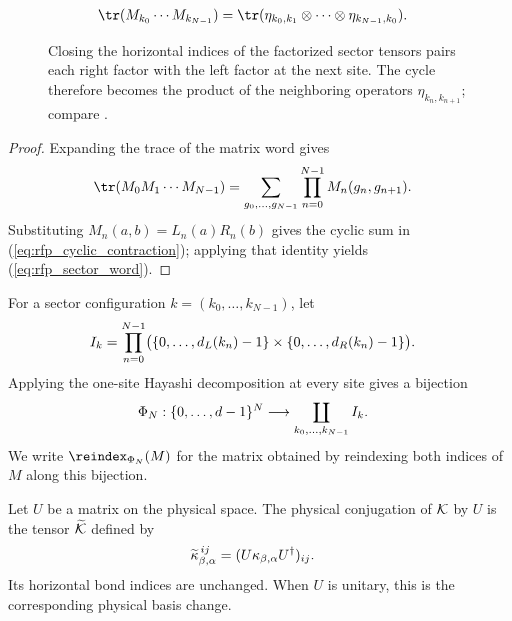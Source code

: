 \begin{figure}[ht]
    \centering
    \begin{align}
        \tr(M_{k_0}\cdots M_{k_{N-1}})
         & =\tr(\eta_{k_0,k_1}\otimes\cdots\otimes\eta_{k_{N-1},k_0}).
        \notag
    \end{align}
    \caption{Closing the horizontal indices of the factorized sector tensors
        pairs each right factor with the left factor at the next site. The cycle
        therefore becomes the product of the neighboring operators
        $\eta_{k_n,k_{n+1}}$; compare
        \cite[Appendix~C.2, lines~1446--1450]{Cirac2016MPDO_arXiv}.}
    \label{fig:mpdo_cyclic_eta_contraction}
\end{figure}

\begin{proof}
    \leanok
    Expanding the trace of the matrix word gives
    \begin{align}
        \tr(M_0M_1\cdots M_{N-1})
         & =\sum_{g_0,\ldots,g_{N-1}}
        \prod_{n=0}^{N-1}M_n(g_n,g_{n+1}). \notag
    \end{align}
    Substituting $M_n(a,b)=L_n(a)R_n(b)$ gives the cyclic sum
    in (\ref{eq:rfp_cyclic_contraction}); applying that identity yields
    (\ref{eq:rfp_sector_word}).
\end{proof}

\begin{definition}
    \label{def:mpdo_sector_chain_coordinates}
    \leanok
    For a sector configuration $k=(k_0,\ldots,k_{N-1})$, let
    \begin{align}
        I_k & =\prod_{n=0}^{N-1}
        \bigl(\{0,\ldots,d_L(k_n)-1\}\times
        \{0,\ldots,d_R(k_n)-1\}\bigr). \notag
    \end{align}
    Applying the one-site Hayashi decomposition at every site gives a
    bijection
    \begin{align}
        \Phi_N:\{0,\ldots,d-1\}^N
         & \longrightarrow
        \coprod_{k_0,\ldots,k_{N-1}} I_k. \notag
    \end{align}
    We write $\reindex_{\Phi_N}(M)$ for the matrix obtained by
    reindexing both indices of $M$ along this bijection.
\end{definition}

\begin{definition}
    \label{def:mpdo_conjugate_physical}
    \leanok
    Let $U$ be a matrix on the physical space. The physical conjugation of
    ${\cal K}$ by $U$ is the tensor $\widetilde{\cal K}$ defined by
    \begin{align}
        \widetilde\kappa_{\beta,\alpha}^{\,ij}
         & =(U\kappa_{\beta,\alpha}U^\dagger)_{ij}. \notag
    \end{align}
    Its horizontal bond indices are unchanged. When $U$ is unitary, this is
    the corresponding physical basis change.
\end{definition}

